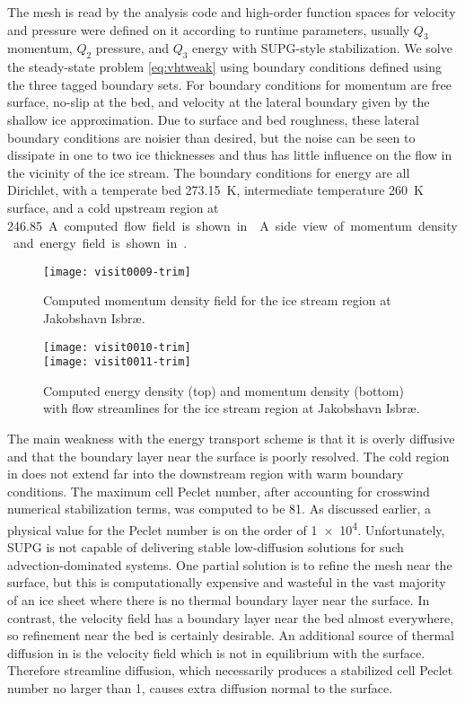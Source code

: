 The mesh is read by the analysis code and high-order function spaces for velocity and pressure were defined on it according to runtime parameters, usually $Q_3$ momentum, $Q_2$ pressure, and $Q_3$ energy with SUPG-style stabilization.
We solve the steady-state problem \eqref{eq:vhtweak} using boundary conditions defined using the three tagged boundary sets.
For boundary conditions for momentum are free surface, no-slip at the bed, and velocity at the lateral boundary given by the shallow ice approximation.
Due to surface and bed roughness, these lateral boundary conditions are noisier than desired, but the noise can be seen to dissipate in one to two ice thicknesses and thus has little influence on the flow in the vicinity of the ice stream.
The boundary conditions for energy are all Dirichlet, with a temperate bed \SI{273.15}{\kelvin}, intermediate temperature \SI{260}{\kelvin} surface, and a cold upstream region at \SI{246.85}.
A computed flow field is shown in .
A side view of momentum density and energy field is shown in .

\begin{figure}
  \centering\texttt{[image: visit0009-trim]}
  \caption{Computed momentum density field for the ice stream region at Jakobshavn Isbr{\ae}.}\label{fig:jakoflow}
\end{figure}

\begin{figure}
  \centering
  \texttt{[image: visit0010-trim]} \\
  \texttt{[image: visit0011-trim]}
  \caption{Computed energy density (top) and momentum density (bottom) with flow streamlines for the ice stream region at Jakobshavn Isbr{\ae}.}\label{fig:jakosideview}
\end{figure}

The main weakness with the energy transport scheme is that it is overly diffusive and that the boundary layer near the surface is poorly resolved.
The cold region in  does not extend far into the downstream region with warm boundary conditions.
The maximum cell Peclet number, after accounting for crosswind numerical stabilization terms, was computed to be 81.
As discussed earlier, a physical value for the Peclet number is on the order of \num{1e4}.
Unfortunately, SUPG is not capable of delivering stable low-diffusion solutions for such advection-dominated systems.
One partial solution is to refine the mesh near the surface, but this is computationally expensive and wasteful in the vast majority of an ice sheet where there is no thermal boundary layer near the surface.
In contrast, the velocity field has a boundary layer near the bed almost everywhere, so refinement near the bed is certainly desirable.
An additional source of thermal diffusion in  is the velocity field which is not in equilibrium with the surface.
Therefore streamline diffusion, which necessarily produces a stabilized cell Peclet number no larger than 1, causes extra diffusion normal to the surface.
